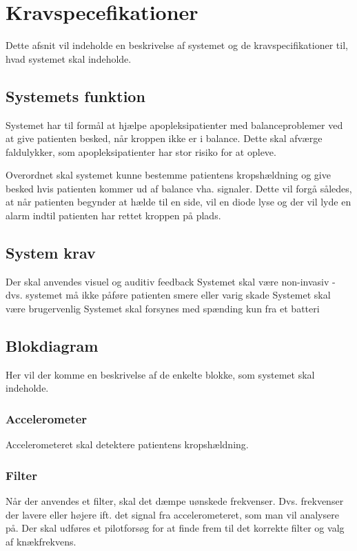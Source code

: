 \section{Kravspecefikationer}
Dette afsnit vil indeholde en beskrivelse af systemet og de kravspecifikationer til, hvad systemet skal indeholde. 

\subsection{Systemets funktion}
Systemet har til formål at hjælpe apopleksipatienter med balanceproblemer ved at give patienten besked, når kroppen ikke er i balance. Dette skal afværge faldulykker, som apopleksipatienter har stor risiko for at opleve.

Overordnet skal systemet kunne bestemme patientens kropshældning og give besked hvis patienten kommer ud af balance vha. signaler. Dette vil forgå således, at når patienten begynder at hælde til en side, vil en diode lyse og der vil lyde en alarm indtil patienten har rettet kroppen på plads. 

\subsection{System krav}
\begin{itemize}
Der skal anvendes visuel og auditiv feedback 
Systemet skal være non-invasiv - dvs. systemet må ikke påføre patienten smere eller varig skade
Systemet skal være brugervenlig
Systemet skal forsynes med spænding kun fra et batteri
\end{itemize}

\subsection{Blokdiagram}
Her vil der komme en beskrivelse af de enkelte blokke, som systemet skal indeholde.

\subsubsection{Accelerometer}
Accelerometeret skal detektere patientens kropshældning.

\subsubsection{Filter}
Når der anvendes et filter, skal det dæmpe uønskede frekvenser. Dvs. frekvenser der lavere eller højere ift. det signal fra accelerometeret, som man vil analysere på. Der skal udføres et pilotforsøg for at finde frem til det korrekte filter og valg af knækfrekvens. 

